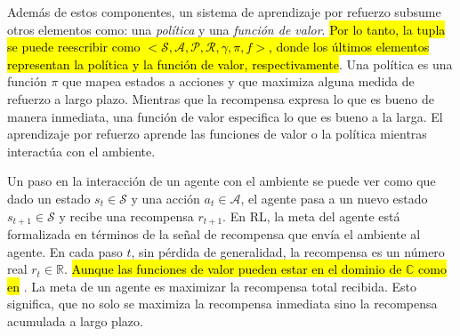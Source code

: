 Además de estos componentes, un sistema de aprendizaje por refuerzo subsume otros elementos como: una \textit{política} y una \textit{función de valor}. \hl{Por lo tanto, la tupla se puede reescribir como $< \mathcal{S}, \mathcal{A}, \mathcal{P}, \mathcal{R}, \gamma, \pi, f>$, donde los últimos elementos representan la política y la función de valor, respectivamente}. Una política es una función $\pi$ que mapea estados
a acciones y que maximiza alguna medida de refuerzo a largo plazo. Mientras que la recompensa expresa lo que es bueno
de manera inmediata, una función de valor especifica lo que
es bueno a la larga. 
El aprendizaje por refuerzo aprende las funciones de valor o la política mientras 
interactúa con el ambiente.



 Un paso en la interacción de un agente con el ambiente se puede ver como que dado un estado $s_t \in \mathcal{S}$ y una
acción $a_t\in \mathcal{A}$, el agente pasa a un nuevo
estado $s_{t+1} \in \mathcal{S}$ y recibe una recompensa
$r_{t+1}$.
En RL, la meta del agente está formalizada
en términos de la señal de recompensa que
envía el ambiente al agente. En cada paso $t$, sin pérdida de generalidad, la recompensa es un número real $r_t \in \mathbb{R}$. \hl{Aunque las funciones de valor pueden estar en el dominio de $\mathbb{C}$ como en} \cite{complexRLhamagami}. La meta de un agente
es maximizar la recompensa total recibida.
Esto significa, que no solo se maximiza la recompensa inmediata sino la recompensa acumulada a largo plazo.

